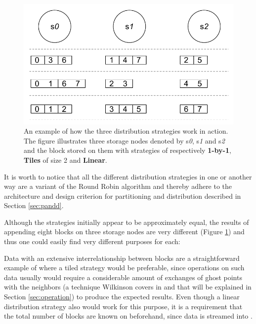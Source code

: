 \begin{figure}[ht!]
	\centering
	\includegraphics[scale=0.85]{pdf/distribution-strategies.pdf}
	\vspace*{3mm}
	\caption[Distribution strategies]{An example of how the three distribution strategies work in action. The figure illustrates three storage nodes denoted by s\textit{0}, s\textit{1} and s\textit{2} and the block stored on them with strategies of respectively \textbf{1-by-1}, \textbf{Tiles} of size 2 and \textbf{Linear}. \label{fig:distribution-strategies}}
\end{figure}	

It is worth to notice that all the different distribution strategies in one or another way are a variant of the Round Robin algorithm and thereby adhere to the architecture and design criterion for partitioning and distribution described in Section \ref{sec:pandd}.
\newline

Although the strategies initially appear to be approximately equal, the results of appending eight blocks on three storage nodes are very different (Figure \ref{fig:distribution-strategies}) and thus one could easily find very different purposes for each:
\newline

Data with an extensive interrelationship between blocks are a straightforward example of where a tiled strategy would be preferable, since operations on such data usually would require a considerable amount of exchanges of ghost points with the neighbors (a technique Wilkinson \etal covers in \cite{Wilkinson:1998:PPT:289352} and that will be explained in Section \ref{sec:operation}) to produce the expected results. Even though a linear distribution strategy also would work for this purpose, it is a requirement that the total number of blocks are known on beforehand, since data is streamed into \CodeName.
\newline

